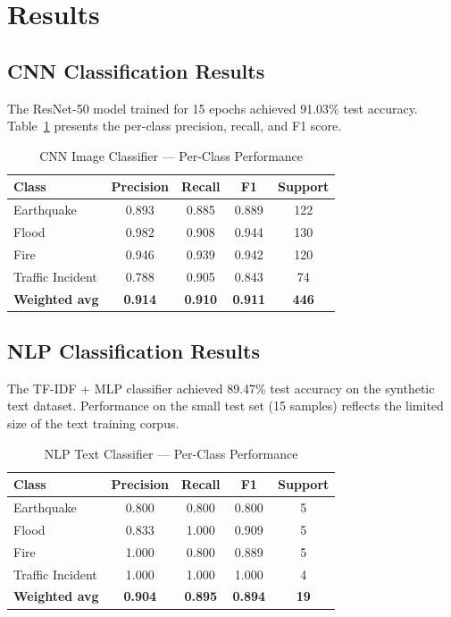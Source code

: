 \documentclass[conference]{IEEEtran}
\begin{document}
\section{Results}
\label{sec:results}

\subsection{CNN Classification Results}

The ResNet-50 model trained for 15 epochs achieved 91.03\% test accuracy. Table~\ref{tab:cnn_results} presents the per-class precision, recall, and F1 score.

\begin{table}[h]
\caption{CNN Image Classifier — Per-Class Performance}
\label{tab:cnn_results}
\centering
\begin{tabular}{lcccc}
\toprule
\textbf{Class} & \textbf{Precision} & \textbf{Recall} & \textbf{F1} & \textbf{Support} \\
\midrule
Earthquake       & 0.893 & 0.885 & 0.889 & 122 \\
Flood            & 0.982 & 0.908 & 0.944 & 130 \\
Fire             & 0.946 & 0.939 & 0.942 & 120 \\
Traffic Incident & 0.788 & 0.905 & 0.843 & 74  \\
\midrule
\textbf{Weighted avg} & \textbf{0.914} & \textbf{0.910} & \textbf{0.911} & \textbf{446} \\
\bottomrule
\end{tabular}
\end{table}

\subsection{NLP Classification Results}

The TF-IDF + MLP classifier achieved 89.47\% test accuracy on the synthetic text dataset. Performance on the small test set (15 samples) reflects the limited size of the text training corpus.

\begin{table}[h]
\caption{NLP Text Classifier — Per-Class Performance}
\label{tab:nlp_results}
\centering
\begin{tabular}{lcccc}
\toprule
\textbf{Class} & \textbf{Precision} & \textbf{Recall} & \textbf{F1} & \textbf{Support} \\
\midrule
Earthquake       & 0.800 & 0.800 & 0.800 & 5 \\
Flood            & 0.833 & 1.000 & 0.909 & 5 \\
Fire             & 1.000 & 0.800 & 0.889 & 5 \\
Traffic Incident & 1.000 & 1.000 & 1.000 & 4 \\
\midrule
\textbf{Weighted avg} & \textbf{0.904} & \textbf{0.895} & \textbf{0.894} & \textbf{19} \\
\bottomrule
\end{tabular}
\end{table}
\end{document}
